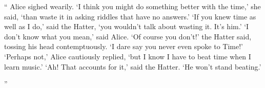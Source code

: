 ``
Alice sighed wearily. ‘I think you might do something better with the time,’
she said, ‘than waste it in asking riddles that have no answers.’
‘If you knew time as well as I do,’ said the Hatter, ‘you wouldn’t talk about
wasting it. It’s him.’
‘I don’t know what you mean,’ said Alice.
‘Of course you don’t!’ the Hatter said, tossing his head contemptuously. ‘I
dare say you never even spoke to Time!’
‘Perhaps not,’ Alice cautiously replied, ‘but I know I have to beat time
when I learn music.’
‘Ah! That accounts for it,’ said the Hatter. ‘He won’t stand beating.’

''

\newpage


